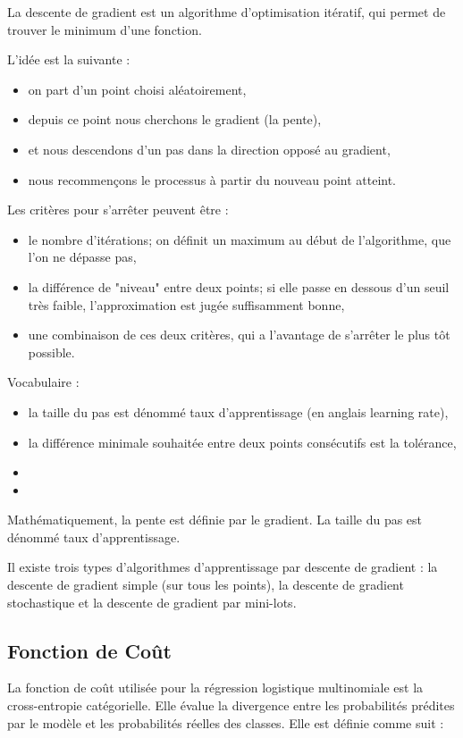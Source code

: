 \documentclass[10pt,french]{report}
\begin{document}
    La descente de gradient est un algorithme d'optimisation itératif, qui permet de trouver le minimum d'une fonction.

    L'idée est la suivante :
    \begin{itemize}
    	\item on part d'un point choisi aléatoirement,
    	\item depuis ce point nous cherchons le gradient (la pente),
    	\item et nous descendons d'un pas dans la direction opposé au gradient,
    	\item nous recommençons le processus à partir du nouveau point atteint.
    \end{itemize}

    Les critères pour s'arrêter peuvent être :
    \begin{itemize}
    	\item le nombre d'itérations; on définit un maximum au début de l'algorithme, que l'on ne dépasse pas,
    	\item la différence de "niveau" entre deux points; si elle passe en dessous d'un seuil très faible, l'approximation est jugée suffisamment bonne,
    	\item une combinaison de ces deux critères, qui a l'avantage de s'arrêter le plus tôt possible.
    \end{itemize}

    Vocabulaire :
    \begin{itemize}
    	\item la taille du pas est dénommé taux d'apprentissage (en anglais learning rate),
    	\item la différence minimale souhaitée entre deux points consécutifs est la tolérance,
    	\item
    	\item
    \end{itemize}

    Mathématiquement, la pente est définie par le gradient. La taille du pas est dénommé taux d'apprentissage.

    Il existe trois types d'algorithmes d'apprentissage par descente de gradient : la descente de gradient simple (sur tous les points), la descente de gradient stochastique et la descente de gradient par mini-lots.


	\subsection{Fonction de Coût}
	La fonction de coût utilisée pour la régression logistique multinomiale est la cross-entropie catégorielle. Elle évalue la divergence entre les probabilités prédites par le modèle et les probabilités réelles des classes. Elle est définie comme suit :
\end{document}
